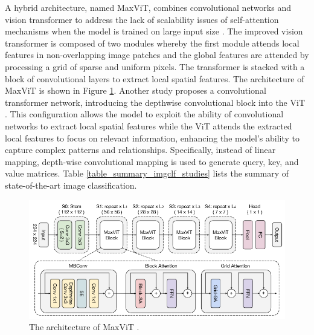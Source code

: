 \documentclass[preprint,12pt]{elsarticle}
\begin{document}
A hybrid architecture, named MaxViT, combines convolutional networks and vision transformer to address the lack of scalability issues of self-attention mechanisms when the model is trained on large input size \citep{tu_maxvit_2022}. The improved vision transformer is composed of two modules whereby the first module attends local features in non-overlapping image patches and the global features are attended by processing a grid of sparse and uniform pixels. The transformer is stacked with a block of convolutional layers to extract local spatial features. The architecture of MaxViT is shown in Figure \ref{fig_img_clf_MaxViT}. Another study proposes a convolutional transformer network, introducing the depthwise convolutional block into the ViT \citep{ma_convolutional_2024}. This configuration allows the model to exploit the ability of convolutional networks to extract local spatial features while the ViT attends the extracted local features to focus on relevant information, enhancing the model’s ability to capture complex patterns and relationships. Specifically, instead of linear mapping, depth-wise convolutional mapping is used to generate query, key, and value matrices. Table \ref{table_summary_imgclf_studies} lists the summary of state-of-the-art image classification.

\begin{figure}[h!]
    \centering
    \includegraphics[scale=0.7]{fig_img_clf_MaxViT.png}
    \caption{The architecture of MaxViT \citep{tu_maxvit_2022}.}
    \label{fig_img_clf_MaxViT}
\end{figure}
\end{document}
